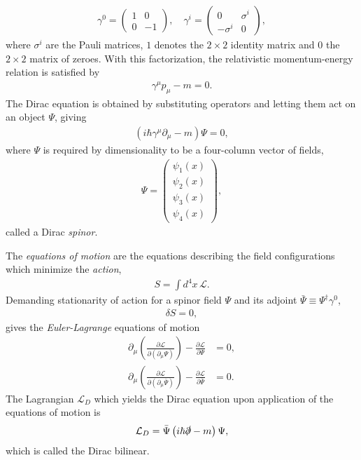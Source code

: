 \documentclass[twoside,english]{uiofysmaster}
\begin{document}
\begin{align}
	\gamma^0 = \begin{pmatrix}
		1 & 0 \\ 0 & -1
	\end{pmatrix}, \quad{} \gamma^i = \begin{pmatrix}
		0 & \sigma^i \\ -\sigma^i & 0
	\end{pmatrix},
\end{align}
where $\sigma^i$ are the Pauli matrices, $1$ denotes the $2\times 2$ identity matrix and $0$ the $2\times 2$ matrix of zeroes. With this factorization, the relativistic momentum-energy relation is satisfied by
\begin{align}
	\gamma^\mu p_\mu - m = 0.
\end{align}
The Dirac equation is obtained by substituting operators and letting them act on an object $\Psi$, giving
\begin{align}
	\left(i\hbar \gamma^\mu \partial_\mu - m\right)\Psi = 0,
\end{align}
where $\Psi$ is required by dimensionality to be a four-column vector of fields,
\begin{align}
	\Psi = \begin{pmatrix}
		\psi_1(x) \\ \psi_2(x) \\ \psi_3(x) \\ \psi_4(x)
	\end{pmatrix},
\end{align}
called a Dirac {\it spinor}.

The {\it equations of motion} are the equations describing the field configurations which minimize the {\it action},
\begin{align}
	S = \int d^4 x \, \mathcal{L}.
\end{align}
Demanding stationarity of action for a spinor field $\Psi$ and its adjoint $\bar\Psi \equiv  \Psi^\dag \gamma^0$,
\begin{align}
	\delta S = 0,
\end{align}
gives the {\it Euler-Lagrange} equations of motion
\begin{align}
	\partial_{\mu}\left(\frac{\partial\mathcal{L}}{\partial\left(\partial_{\mu}\Psi\right)}\right) - \frac{\partial\mathcal{L}}{\partial\Psi} &= 0,\\
	\partial_{\mu}\left(\frac{\partial\mathcal{L}}{\partial\left(\partial_{\mu}\bar\Psi\right)}\right) - \frac{\partial\mathcal{L}}{\partial\bar\Psi} &= 0.
\end{align}
The Lagrangian $\mathcal{L}_D$ which yields the Dirac equation upon application of the equations of motion is
\begin{align}
	\mathcal{L}_D = \bar \Psi \left( i\hbar \slashed \partial - m \right)\Psi,
\end{align}
which is called the Dirac bilinear.
\end{document}
